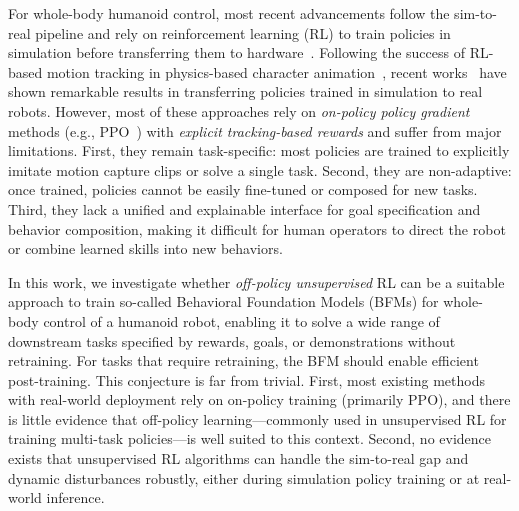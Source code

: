  
 
For whole-body humanoid control, most recent advancements follow the sim-to-real pipeline and rely on reinforcement learning (RL) to train policies in simulation before transferring them to hardware~\citep{gu2025humanoid}. Following the success of RL-based motion tracking in physics-based character animation~\citep[e.g.,][]{Luo2024universal, TesslerGNCP24,TirinzoniTFGKXL25zeroshot}, recent works~\citep[e.g.,][]{Zakka2025mujocoplayground,Seo2025fasttd3,Chen2025gmt,liao2025beyondmimic,he2025asap,cheng2024expressive,he2025omnih2o} have shown remarkable results in transferring policies trained in simulation to real robots. However, most of these approaches rely on \emph{on-policy policy gradient} methods (e.g., PPO~\citep{schulman2017proximal}) with \emph{explicit tracking-based rewards} and suffer from major limitations. First, they remain task-specific: most policies are trained to explicitly imitate motion capture clips or solve a single task. Second, they are non-adaptive: once trained, policies cannot be easily fine-tuned or composed for new tasks. Third, they lack a unified and explainable interface for goal specification and behavior composition, making it difficult for human operators to direct the robot or combine learned skills into new behaviors.


In this work, we investigate whether \emph{off-policy unsupervised} RL can be a suitable approach to train so-called Behavioral Foundation Models (BFMs) for whole-body control of a humanoid robot, enabling it to solve a wide range of downstream tasks specified by rewards, goals, or demonstrations without retraining. For tasks that require retraining, the BFM should enable efficient post-training. 
This conjecture is far from trivial. First, most existing methods with real-world deployment rely on on-policy training (primarily PPO), and there is little evidence that off-policy learning—commonly used in unsupervised RL for training multi-task policies—is well suited to this context. Second, no evidence exists that unsupervised RL algorithms can handle the sim-to-real gap and dynamic disturbances robustly, either during simulation policy training or at real-world inference.

